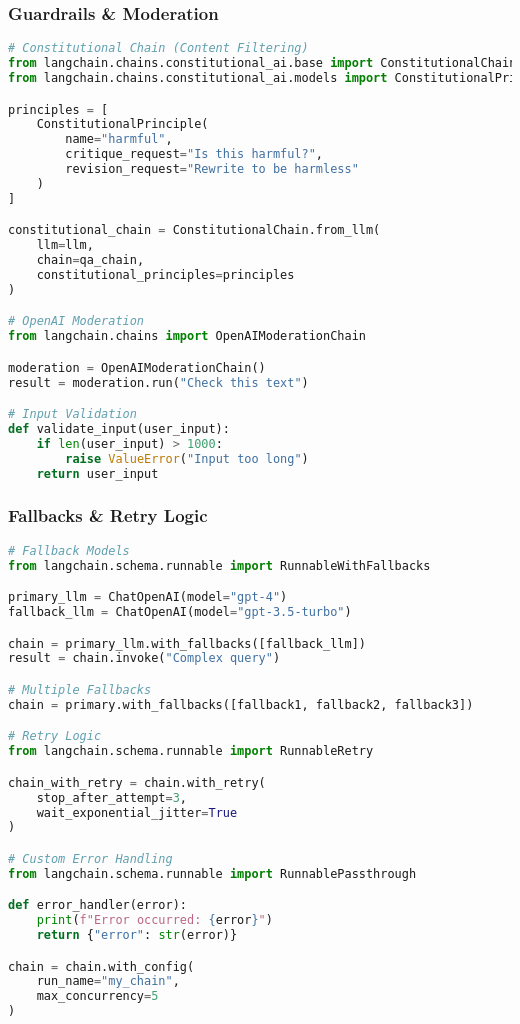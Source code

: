 \begin{frame}[fragile]\frametitle{Guardrails \& Moderation}
\begin{lstlisting}[language=python,basicstyle=\tiny]
# Constitutional Chain (Content Filtering)
from langchain.chains.constitutional_ai.base import ConstitutionalChain
from langchain.chains.constitutional_ai.models import ConstitutionalPrinciple

principles = [
    ConstitutionalPrinciple(
        name="harmful",
        critique_request="Is this harmful?",
        revision_request="Rewrite to be harmless"
    )
]

constitutional_chain = ConstitutionalChain.from_llm(
    llm=llm,
    chain=qa_chain,
    constitutional_principles=principles
)

# OpenAI Moderation
from langchain.chains import OpenAIModerationChain

moderation = OpenAIModerationChain()
result = moderation.run("Check this text")

# Input Validation
def validate_input(user_input):
    if len(user_input) > 1000:
        raise ValueError("Input too long")
    return user_input
\end{lstlisting}
\end{frame}

\begin{frame}[fragile]\frametitle{Fallbacks \& Retry Logic}
\begin{lstlisting}[language=python,basicstyle=\tiny]
# Fallback Models
from langchain.schema.runnable import RunnableWithFallbacks

primary_llm = ChatOpenAI(model="gpt-4")
fallback_llm = ChatOpenAI(model="gpt-3.5-turbo")

chain = primary_llm.with_fallbacks([fallback_llm])
result = chain.invoke("Complex query")

# Multiple Fallbacks
chain = primary.with_fallbacks([fallback1, fallback2, fallback3])

# Retry Logic
from langchain.schema.runnable import RunnableRetry

chain_with_retry = chain.with_retry(
    stop_after_attempt=3,
    wait_exponential_jitter=True
)

# Custom Error Handling
from langchain.schema.runnable import RunnablePassthrough

def error_handler(error):
    print(f"Error occurred: {error}")
    return {"error": str(error)}

chain = chain.with_config(
    run_name="my_chain",
    max_concurrency=5
)
\end{lstlisting}
\end{frame}

